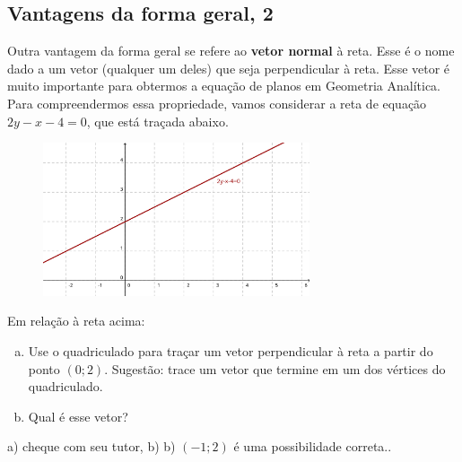 \documentclass[main.tex]{subfiles}
\begin{document}
\subsection*{Vantagens da forma geral, 2}

Outra vantagem da forma geral se refere ao \textbf{vetor normal} à reta. Esse é o nome dado a um vetor (qualquer um deles) que seja perpendicular à reta. Esse vetor é muito importante para obtermos a equação de planos em Geometria Analítica. Para compreendermos essa propriedade, vamos considerar a reta de equação $2y-x-4=0$, que está traçada abaixo.

\begin{figure}[h]
\centering
\includegraphics[width=0.7\textwidth]{./img/c6q8.png}
\end{figure}

\begin{questao}
Em relação à reta acima:
\begin{enumerate}[a)]
\item Use o quadriculado para traçar um vetor perpendicular à reta a partir do ponto $(0;2)$. Sugestão: trace um vetor que termine em um dos vértices do quadriculado.
\item Qual é esse vetor?
\end{enumerate} 
\end{questao}


\begin{gabarito}
	\begin{gabaritoQuestao}
		a) cheque com seu tutor, b) b) $(-1;2)$ é uma possibilidade correta..
	\end{gabaritoQuestao}
\end{gabarito}
\end{document}
